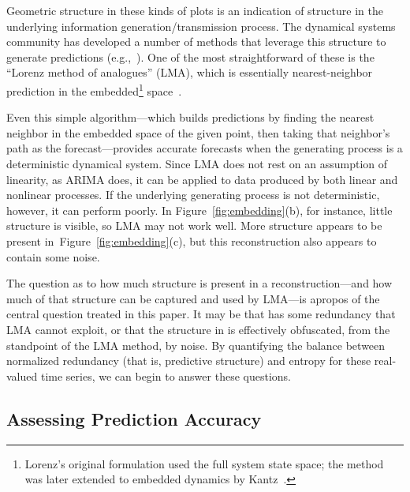 Geometric structure in these kinds of plots is an indication of
structure in the underlying information generation/transmission
process.  The dynamical systems community has developed a number of
methods that leverage this structure to generate predictions
(e.g.,~\cite{weigend-book,casdagli-eubank92,Smith199250}).  One of the
most straightforward of these is the ``Lorenz method of analogues''
(LMA), which is essentially nearest-neighbor prediction in the
embedded\footnote{Lorenz's original formulation used the full system
  state space; the method was later extended to embedded dynamics by
  Kantz~\cite{kantz-lma-citation}.} space~\cite{lorenz-analogues}.

Even this simple algorithm---which builds predictions by finding the
nearest neighbor in the embedded space of the given point, then taking
that neighbor's path as the forecast---provides accurate forecasts
when the generating process is a deterministic dynamical system.
Since LMA does not rest on an assumption of linearity, as ARIMA does,
it can be applied to data produced by both linear and nonlinear
processes.  If the underlying generating process is not deterministic,
however, it can perform poorly.  In Figure~\ref{fig:embedding}(b), for
instance, little structure is visible, so LMA may not work well.  More
structure appears to be present in~Figure~\ref{fig:embedding}(c), but
this reconstruction also appears to contain some noise.

The question as to how much structure is present in a
reconstruction---and how much of that structure can be captured and
used by LMA---is apropos of the central question treated in this
paper.  It may be that \gcc has some redundancy that LMA cannot
exploit, or that the structure in \svdfive is effectively obfuscated,
from the standpoint of the LMA method, by noise.  By quantifying the
balance between normalized redundancy (that is, predictive structure)
and entropy for these real-valued time series, we can begin to answer
these questions.  


\subsection{Assessing Prediction Accuracy}
\label{sec:accuracy}

